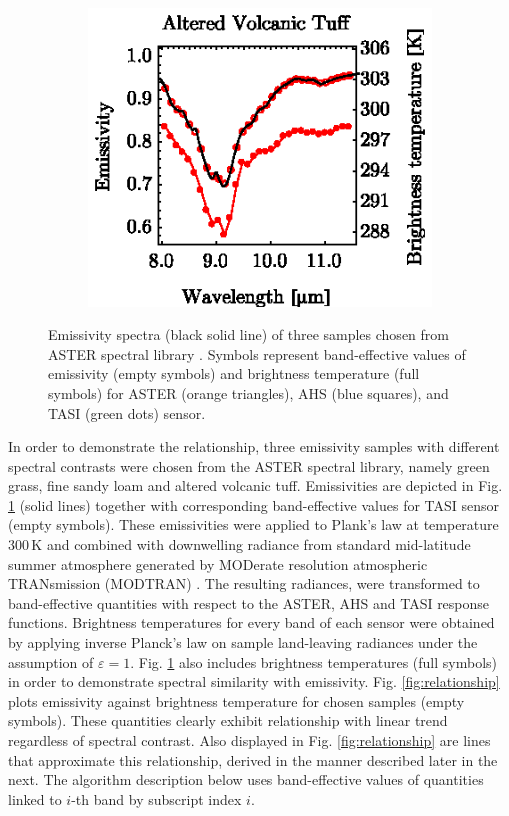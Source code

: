 \begin{figure}[thb]
\begin{subfigure}[t]{.3\linewidth}
		\centering
		\includegraphics[scale=1]{pics/Chapter_03/AlteredVolcanicTuff_Emiss_vs_BrightTemp.eps}
		\vspace{-0.4cm}
		\caption{}
	\end{subfigure}
	\vspace{1.5 em}
	\caption{Emissivity spectra (black solid line) of three samples chosen from ASTER spectral library \cite{BH09}. Symbols represent band-effective values of emissivity (empty symbols) and brightness temperature (full symbols) for ASTER (orange triangles), AHS (blue squares), and TASI (green dots) sensor. }
	\label{fig:emissivitySpectra_spectra}
\end{figure}

In order to demonstrate the relationship, three emissivity samples with different spectral contrasts were chosen from the ASTER spectral library, namely green grass, fine sandy loam and altered volcanic tuff. Emissivities are depicted in Fig. \ref{fig:emissivitySpectra_spectra} (solid lines) together with corresponding band-effective values for TASI sensor (empty symbols). These emissivities were applied to Plank's law at temperature $300\,\mathrm{K}$ and combined with downwelling radiance from standard mid-latitude summer atmosphere generated by MODerate resolution atmospheric TRANsmission (MODTRAN) \cite{BG06}. The resulting radiances, were transformed to band-effective quantities with respect to the ASTER, AHS and TASI response functions. Brightness temperatures for every band of each sensor were obtained by applying inverse Planck's law on sample land-leaving radiances under the assumption of $\varepsilon=1$. Fig. \ref{fig:emissivitySpectra_spectra} also includes brightness temperatures (full symbols) in order to demonstrate spectral similarity with emissivity. Fig. \ref{fig:relationship} plots emissivity against brightness temperature for chosen samples (empty symbols). These quantities clearly exhibit relationship with linear trend regardless of spectral contrast. Also displayed in Fig. \ref{fig:relationship} are lines that approximate this relationship, derived in the manner described later in the next. The algorithm description below uses band-effective values of quantities linked to $i$-th band by subscript index $i$. 

